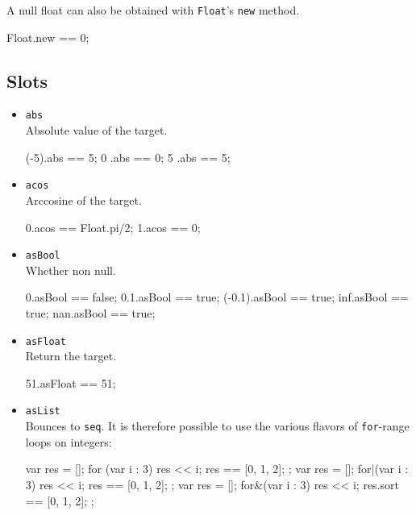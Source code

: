 A null float can also be obtained with \lstinline|Float|'s
\lstinline|new| method.

\begin{urbiassert}[firstnumber=last]
Float.new == 0;
\end{urbiassert}

\subsection{Slots}

\begin{itemize}
\item \lstinline|abs|\\
  Absolute value of the target.
\begin{urbiassert}[firstnumber=last]
(-5).abs == 5;
  0 .abs == 0;
  5 .abs == 5;
\end{urbiassert}

\item \lstinline|acos|\\
  Arccosine of the target.
\begin{urbiassert}[firstnumber=last]
0.acos == Float.pi/2;
1.acos == 0;
\end{urbiassert}

\item \lstinline|asBool|\\
  Whether non null.
\begin{urbiassert}[firstnumber=last]
0.asBool == false;
0.1.asBool == true;
(-0.1).asBool == true;
inf.asBool == true;
nan.asBool == true;
\end{urbiassert}

\item \lstinline|asFloat|\\
  Return the target.
\begin{urbiassert}[firstnumber=last]
51.asFloat == 51;
\end{urbiassert}

\item \lstinline|asList|\\
  Bounces to \lstinline|seq|.  It is therefore possible to use the
  various flavors of \lstinline|for|-range loops on integers:
\begin{urbiassert}[firstnumber=last]
{
  var res = [];
  for (var i : 3)
    res << i;
  res == [0, 1, 2];
};
{
  var res = [];
  for|(var i : 3)
    res << i;
  res == [0, 1, 2];
};
{
  var res = [];
  for&(var i : 3)
    res << i;
  res.sort == [0, 1, 2];
};
\end{urbiassert}%


\end{itemize}
